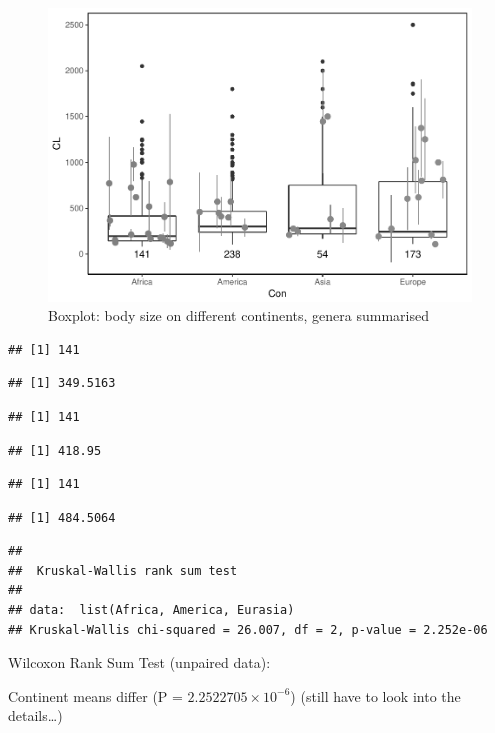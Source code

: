 \documentclass[]{article}
\begin{document}
\begin{figure}[htbp]
\centering
\includegraphics{MA_JJ_files/figure-latex/Boxplot body size split into continents-1.pdf}
\caption{Boxplot: body size on different continents, genera summarised}
\end{figure}

\begin{verbatim}
## [1] 141
\end{verbatim}

\begin{verbatim}
## [1] 349.5163
\end{verbatim}

\begin{verbatim}
## [1] 141
\end{verbatim}

\begin{verbatim}
## [1] 418.95
\end{verbatim}

\begin{verbatim}
## [1] 141
\end{verbatim}

\begin{verbatim}
## [1] 484.5064
\end{verbatim}

\begin{verbatim}
## 
##  Kruskal-Wallis rank sum test
## 
## data:  list(Africa, America, Eurasia)
## Kruskal-Wallis chi-squared = 26.007, df = 2, p-value = 2.252e-06
\end{verbatim}

Wilcoxon Rank Sum Test (unpaired data):

Continent means differ (P = \(2.2522705\times 10^{-6}\)) (still have to
look into the details\ldots{})
\end{document}
